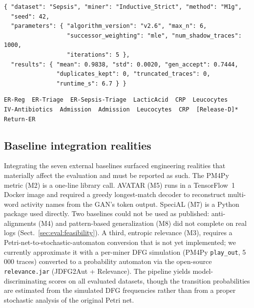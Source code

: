 \documentclass[runningheads]{llncs}
\begin{document}
\begin{lstlisting}[caption={Sidecar config JSON for one cell (abridged).},label={lst:json}]
{ "dataset": "Sepsis", "miner": "Inductive_Strict", "method": "M1g",
  "seed": 42,
  "parameters": { "algorithm_version": "v2.6", "max_n": 6,
                  "successor_weighting": "mle", "num_shadow_traces": 1000,
                  "iterations": 5 },
  "results": { "mean": 0.9838, "std": 0.0020, "gen_accept": 0.7444,
               "duplicates_kept": 0, "truncated_traces": 0,
               "runtime_s": 6.7 } }
\end{lstlisting}

\begin{lstlisting}[caption={A generated shadow trace; the starred event is the Katz-consistent mutation.},label={lst:trace}]
ER-Reg  ER-Triage  ER-Sepsis-Triage  LacticAcid  CRP  Leucocytes
IV-Antibiotics  Admission  Admission  Leucocytes  CRP  [Release-D]*  Return-ER
\end{lstlisting}

\subsection{Baseline integration realities}
\label{sec:impl:baselines}
Integrating the seven external baselines surfaced engineering realities that materially affect the evaluation and must be reported as such. The PM4Py metric (M2) is a one-line library call. AVATAR (M5) runs in a TensorFlow~1 Docker image and required a greedy longest-match decoder to reconstruct multi-word activity names from the GAN's token output. SpeciAL (M7) is a Python package used directly. Two baselines could not be used as published: anti-alignments (M4) and pattern-based generalization (M8) did not complete on real logs (Sect.~\ref{sec:eval:feasibility}). A third, entropic relevance (M3), requires a Petri-net-to-stochastic-automaton conversion that is not yet implemented; we currently approximate it with a per-miner DFG simulation (PM4Py \texttt{play\_out}, 5\,000 traces) converted to a probability automaton via the open-source \texttt{relevance.jar} (JDFG2Aut + Relevance). The pipeline yields model-discriminating scores on all evaluated datasets, though the transition probabilities are estimated from the simulated DFG frequencies rather than from a proper stochastic analysis of the original Petri net.
\end{document}
